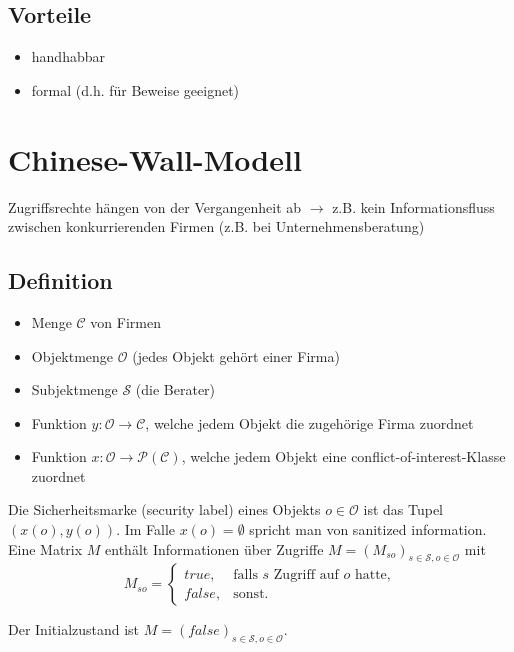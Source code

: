 \documentclass[a4paper,twoside,DIV15,BCOR12mm]{scrbook}
\begin{document}
\subsection{Vorteile}

\begin{itemize}
	\item handhabbar
	\item formal (d.h. für Beweise geeignet)
\end{itemize}

\section{Chinese-Wall-Modell}

Zugriffsrechte hängen von der Vergangenheit ab $\rightarrow$ z.B. kein Informationsfluss zwischen konkurrierenden Firmen (z.B. bei Unternehmensberatung)

\subsection{Definition}

\begin{itemize}
	\item Menge $\mathcal{C}$ von Firmen
	\item Objektmenge $\mathcal{O}$ (jedes Objekt gehört einer Firma)
	\item Subjektmenge $\mathcal{S}$ (die Berater)
	\item Funktion $y \colon \mathcal{O} \rightarrow \mathcal{C}$, welche jedem Objekt die zugehörige Firma zuordnet
	\item Funktion $x \colon \mathcal{O} \rightarrow \mathcal{P}(\mathcal{C})$, welche jedem Objekt eine conflict-of-interest-Klasse zuordnet
\end{itemize}

Die Sicherheitsmarke (security label) eines Objekts $o \in \mathcal{O}$ ist das Tupel $(x(o), y(o))$. Im Falle $x(o) = \emptyset$ spricht man von \glqq sanitized information\grqq.\\

Eine Matrix $M$ enthält Informationen über Zugriffe $M = (M_{so})_{s \in \mathcal{S}, o \in \mathcal{O}}$ mit
$$M_{so} = 	\begin{cases}
				true,  & \text{falls }s\text{ Zugriff auf }o\text{ hatte,}\\
				false, & \text{sonst.}
			\end{cases}$$
			
Der Initialzustand ist $M = (false)_{s \in \mathcal{S}, o \in \mathcal{O}}$.
\end{document}
